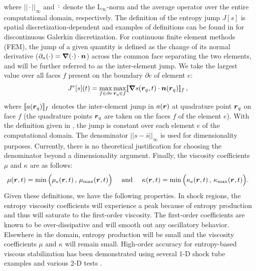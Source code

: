 %
where $|| \cdot ||_\infty$ and $\bar{\cdot}$ denote the L$_\infty$-norm and the average operator over the entire computational domain, respectively. The definition of the entropy jump $J[s]$ is spatial discretization-dependent and examples of definitions can be found in \cite{valentin} for discontinuous Galerkin discretization. For continuous finite element methods (FEM), the jump of a given quantity is defined as the change of its normal derivative ($\partial_n (\cdot) = \boldsymbol{\nabla}(\cdot) \cdot \boldsymbol n$) across the common face separating the two elements, and will be further referred to as the inter-element jump. We take the largest value over all faces $f$ present on the boundary $\partial e$ of element $e$:
%
\begin{equation}
\label{eq:jump_CFEM}
J^e[s](t) = \max_{f\in\partial e}  \max_{\boldsymbol r_q \in f} [\![\boldsymbol{\nabla} s(\boldsymbol r_q,t) \cdot \boldsymbol n(\boldsymbol r_q) ]\!]_f \, ,
\end{equation}
%
where $[\![a(\boldsymbol r_q)]\!]_f$ denotes the inter-element jump in $a(\boldsymbol r)$ at quadrature point $\boldsymbol r_q$ on face $f$ (the quadrature points $\boldsymbol r_q$ are taken on the faces $f$ of the element $e$). With the definition given in , the jump is constant over each element $e$ of the computational domain. 
The denominator $|| s - \bar{s} ||_\infty$ is used for dimensionality purposes.
Currently, there is no theoretical justification for choosing the denominator beyond a dimensionality argument. 
Finally, the viscosity coefficients $\mu$ and $\kappa$ are as follows:
%
\begin{equation}
\mu(\boldsymbol r,t)    = \min\Big( \mu_e(\boldsymbol r,t)   \,,\, \mu_{\max}(\boldsymbol r,t)    \Big) 
\quad \text{ and } \quad 
\kappa(\boldsymbol r,t) = \min\Big( \kappa_e(\boldsymbol r,t)\,,\, \kappa_{\max}(\boldsymbol r,t) \Big).
\end{equation}
%
Given these definitions, we have the following properties.
In shock regions, the entropy viscosity coefficients will experience a peak because of entropy production and thus will saturate to the first-order viscosity. The first-order coefficients are known to be over-dissipative and will smooth out any oscillatory behavior. Elsewhere in the domain, entropy production will be small and the viscosity coefficients $\mu$ and $\kappa$ will remain small. %
High-order accuracy for entropy-based viscous stabilization has been demonstrated using several 1-D shock tube examples and various 2-D tests \cite{jlg1, jlg2, valentin}.

